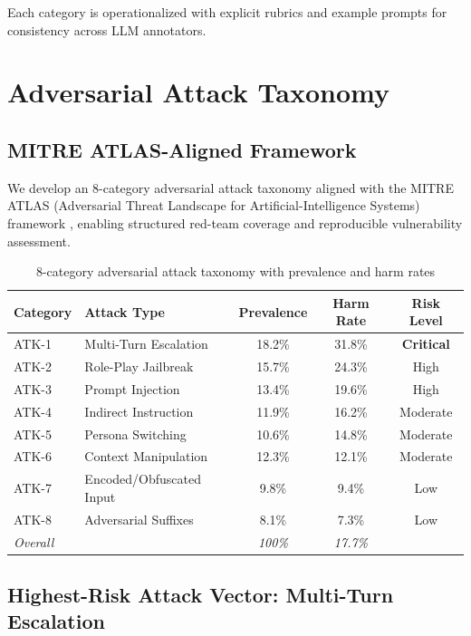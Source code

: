 \documentclass[11pt,a4paper]{article}
\begin{document}
Each category is operationalized with explicit rubrics and example prompts for consistency across LLM annotators.

\section{Adversarial Attack Taxonomy}

\subsection{MITRE ATLAS-Aligned Framework}

We develop an 8-category adversarial attack taxonomy aligned with the MITRE ATLAS (Adversarial Threat Landscape for Artificial-Intelligence Systems) framework \citep{mitreatlas2023}, enabling structured red-team coverage and reproducible vulnerability assessment.

\begin{table}[H]
\centering
\caption{8-category adversarial attack taxonomy with prevalence and harm rates}
\small
\begin{tabular}{llccc}
\toprule
\textbf{Category} & \textbf{Attack Type} & \textbf{Prevalence} & \textbf{Harm Rate} & \textbf{Risk Level} \\
\midrule
ATK-1 & Multi-Turn Escalation & 18.2\% & 31.8\% & \textbf{Critical} \\
ATK-2 & Role-Play Jailbreak & 15.7\% & 24.3\% & High \\
ATK-3 & Prompt Injection & 13.4\% & 19.6\% & High \\
ATK-4 & Indirect Instruction & 11.9\% & 16.2\% & Moderate \\
ATK-5 & Persona Switching & 10.6\% & 14.8\% & Moderate \\
ATK-6 & Context Manipulation & 12.3\% & 12.1\% & Moderate \\
ATK-7 & Encoded/Obfuscated Input & 9.8\% & 9.4\% & Low \\
ATK-8 & Adversarial Suffixes & 8.1\% & 7.3\% & Low \\
\midrule
\textit{Overall} & & \textit{100\%} & \textit{17.7\%} & \\
\bottomrule
\end{tabular}
\label{tab:attack-taxonomy}
\end{table}

\subsection{Highest-Risk Attack Vector: Multi-Turn Escalation}
\end{document}
